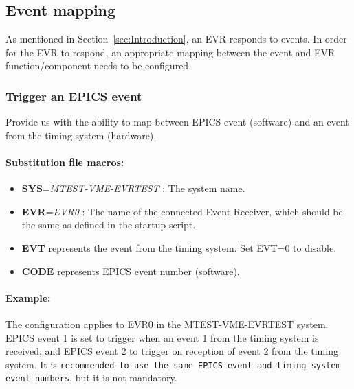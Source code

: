 \documentclass[12pt,a4paper]{article}
\begin{document}
\subsection{Event mapping}\label{sec:Event mapping}
As mentioned in Section~\ref{sec:Introduction}, an EVR responds to events. In order for the EVR to respond, an appropriate mapping between the event and  EVR function/component needs to be configured.



\subsubsection{Trigger an EPICS event}\label{evr-softevent.template}
Provide us with the ability to map between EPICS event (software) and an event from the timing system (hardware).

\paragraph{Substitution file macros:}
\begin{itemize}
	\item
		\textbf{SYS}=\emph{MTEST-VME-EVRTEST} : The system name.
	\item
		\textbf{EVR}=\emph{EVR0} : The name of the connected Event Receiver, which should be the same as defined in the startup script. 
	\item
	  \textbf{EVT} represents the event from the timing system. Set EVT=0 to disable.
	\item
	  \textbf{CODE} represents EPICS event number (software).
\end{itemize}

\paragraph{Example:} The configuration applies to EVR0 in the MTEST-VME-EVRTEST system. EPICS event 1 is set to trigger when an event 1 from the timing system is received, and EPICS event 2 to trigger on reception of event 2 from the timing system. It is \texttt{recommended to use the same EPICS event and timing system event numbers}, but it is not mandatory.
\end{document}
